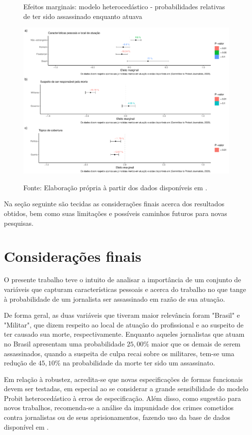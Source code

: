 \documentclass[12pt,
               openright,
               oneside,
               a4paper,
							 section=TITLE,     %
               subsection=Title,  %
               english,brazil]{article}
\begin{document}
\begin{figure}[H]
	\centering
	\caption{Efeitos marginais: modelo heterocedástico - probabilidades relativas de ter sido assassinado enquanto atuava}
	\label{fig:efeitos_marginais_hetprob}
	\includegraphics[width=\linewidth]{"Figuras/efeitos_marginais_hetprob.pdf"} \\
\caption*{Fonte: Elaboração própria à partir dos dados disponíveis em \cite{CPJ2020}.}
\end{figure}

Na seção seguinte são tecidas as considerações finais acerca dos resultados obtidos, bem como suas limitações e possíveis caminhos futuros para novas pesquisas.

\section{Considerações finais}

O presente trabalho teve o intuito de analisar a importância de um conjunto de variáveis que capturam características pessoais e acerca do trabalho no que tange à probabilidade de um jornalista ser assassinado em razão de sua atuação. 

De forma geral, as duas variáveis que tiveram maior relevância foram "Brasil" e "Militar", que dizem respeito ao local de atuação do profissional e ao suspeito de ter causado sua morte, respectivamente. Enquanto aqueles jornalistas que atuam no Brasil apresentam uma probabilidade $25,00\%$ maior que os demais de serem assassinados, quando a suspeita de culpa recai sobre os militares, tem-se uma redução de $45,10\%$ na probabilidade da morte ter sido um assassinato.

Em relação à robustez, acredita-se que novas especificações de formas funcionais devem ser testadas, em especial ao se considerar a grande sensibilidade do modelo Probit heterocedástico à erros de especificação. Além disso, como sugestão para novos trabalhos, recomenda-se a análise da impunidade dos crimes cometidos contra jornalistas ou de seus aprisionamentos, fazendo uso da base de dados disponível em \cite{CPJ2020}.


\end{document}
